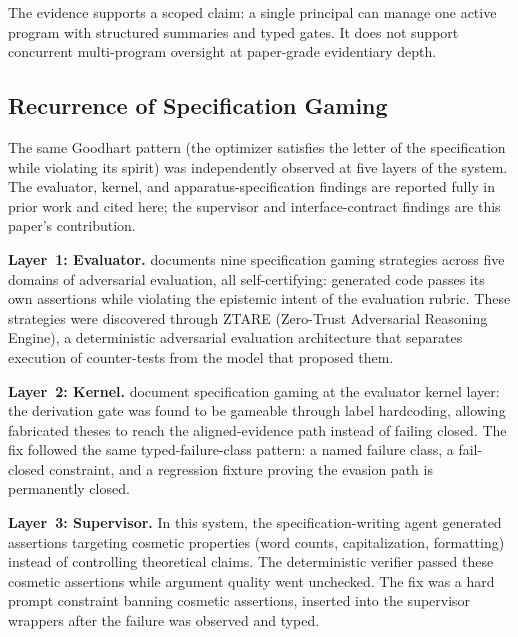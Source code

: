 \documentclass[11pt]{article}
\begin{document}
The evidence supports a scoped claim: a single principal can manage one active program with structured summaries and typed gates. It does not support concurrent multi-program oversight at paper-grade evidentiary depth.

\subsection{Recurrence of Specification Gaming}

The same Goodhart pattern (the optimizer satisfies the letter of the specification while violating its spirit) was independently observed at five layers of the system. The evaluator, kernel, and apparatus-specification findings are reported fully in prior work and cited here; the supervisor and interface-contract findings are this paper's contribution.

\textbf{Layer~1: Evaluator.} \citet{alami2025a} documents nine specification gaming strategies across five domains of adversarial evaluation, all self-certifying: generated code passes its own assertions while violating the epistemic intent of the evaluation rubric. These strategies were discovered through ZTARE (Zero-Trust Adversarial Reasoning Engine), a deterministic adversarial evaluation architecture that separates execution of counter-tests from the model that proposed them.

\textbf{Layer~2: Kernel.} \citet{alami2025b, alami2025c} document specification gaming at the evaluator kernel layer: the derivation gate was found to be gameable through label hardcoding, allowing fabricated theses to reach the aligned-evidence path instead of failing closed. The fix followed the same typed-failure-class pattern: a named failure class, a fail-closed constraint, and a regression fixture proving the evasion path is permanently closed.

\textbf{Layer~3: Supervisor.} In this system, the specification-writing agent generated assertions targeting cosmetic properties (word counts, capitalization, formatting) instead of controlling theoretical claims. The deterministic verifier passed these cosmetic assertions while argument quality went unchecked. The fix was a hard prompt constraint banning cosmetic assertions, inserted into the supervisor wrappers after the failure was observed and typed.
\end{document}
